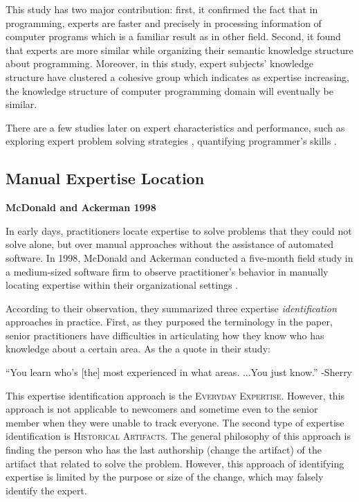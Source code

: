 This study has two major contribution: first, it confirmed the fact that in programming, experts are faster and precisely in processing information of computer programs which is a familiar result as in other field. Second, it found that experts are more similar while organizing their semantic knowledge structure about programming. Moreover, in this study, expert subjects' knowledge structure have clustered a cohesive group which indicates as expertise increasing, the knowledge structure of computer programming domain will eventually be similar. 

There are a few studies later on expert characteristics and performance, such as exploring expert problem solving strategies \cite{davies1994knowledge, koenemann1991expert}, quantifying programmer's skills \cite{stanislaw1994note}.

\subsection{Manual Expertise Location}

\textbf{McDonald and Ackerman 1998}

In early days, practitioners locate expertise to solve problems that they could not solve alone, but over manual approaches without the assistance of automated software. In 1998, McDonald and Ackerman conducted a five-month field study in a medium-sized software firm to observe practitioner's behavior in manually locating expertise within their organizational settings \cite{mcdonald1998just}.

According to their observation, they summarized three expertise \textit{identification} approaches in practice. First, as they purposed the terminology in the paper, senior practitioners have difficulties in articulating how they know who has knowledge about a certain area. As the a quote in their study:

\begin{displayquote}
``You learn who's [the] most experienced in what areas. ...You just know.'' 
-Sherry
\end{displayquote}

This expertise identification approach is the \textsc{Everyday Expertise}. However, this approach is not applicable to newcomers and sometime even to the senior member when they were unable to track everyone. The second type of expertise identification is \textsc{Historical Artifacts}. The general philosophy of this approach is finding the person who has the last authorship (change the artifact) of the artifact that related to solve the problem. However, this approach of identifying expertise is limited by the purpose or size of the change, which may falsely identify the expert.

